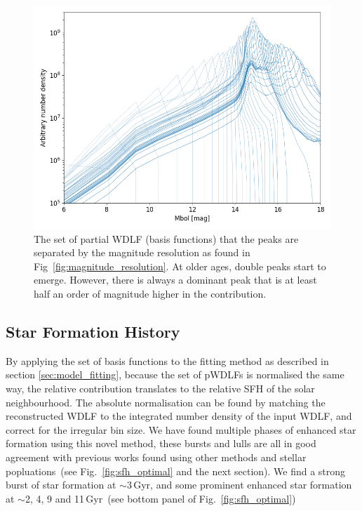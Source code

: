 \documentclass[fleqn,usenatbib]{mnras}
\begin{document}
\begin{figure}
    \includegraphics[width=\columnwidth]{figures/fig_04_basis_pwdlf.png}
    \caption{The set of partial WDLF (basis functions) that the peaks are
    separated by the magnitude resolution as found in
    Fig~\ref{fig:magnitude_resolution}. At older ages, double peaks start to
    emerge. However, there is always a dominant peak that is at least half an
    order of magnitude higher in the contribution.}
    \label{fig:basis_pwdlf}
\end{figure}

\subsection{Star Formation History}

By applying the set of basis functions to the fitting method as described in
section \textsection\ref{sec:model_fitting}, because the set of pWDLFs is
normalised the same way, the relative contribution translates to the relative
SFH of the solar neighbourhood. The absolute normalisation can be found by
matching the reconstructed WDLF to the integrated number density of the input
WDLF, and correct for the irregular bin size. We have found multiple phases of
enhanced star formation using this novel method, these bursts and lulls are all
in good agreement with previous works found using other methods and stellar 
popluations~(see Fig.~\ref{fig:sfh_optimal} and the next section). We find a
strong burst of star formation at $\sim$3\,Gyr, and some prominent enhanced
star formation at $\sim$2, 4, 9 and 11\,Gyr~(see bottom panel of
Fig.~\ref{fig:sfh_optimal})
\end{document}
